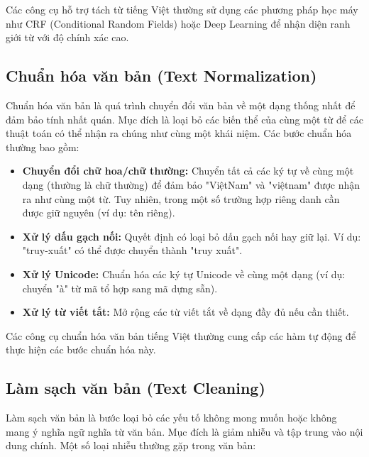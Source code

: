 \documentclass[../BTL.tex]{subfiles}
\begin{document}
Các công cụ hỗ trợ tách từ tiếng Việt thường sử dụng các phương pháp học máy như CRF (Conditional Random Fields) hoặc Deep Learning để nhận diện ranh giới từ với độ chính xác cao.

\subsection{Chuẩn hóa văn bản (Text Normalization)}
Chuẩn hóa văn bản là quá trình chuyển đổi văn bản về một dạng thống nhất để đảm bảo tính nhất quán. Mục đích là loại bỏ các biến thể của cùng một từ để các thuật toán có thể nhận ra chúng như cùng một khái niệm. Các bước chuẩn hóa thường bao gồm:

\begin{itemize}
    \item \textbf{Chuyển đổi chữ hoa/chữ thường:} Chuyển tất cả các ký tự về cùng một dạng (thường là chữ thường) để đảm bảo "ViệtNam" và "việtnam" được nhận ra như cùng một từ. Tuy nhiên, trong một số trường hợp riêng danh cần được giữ nguyên (ví dụ: tên riêng).
    
    \item \textbf{Xử lý dấu gạch nối:} Quyết định có loại bỏ dấu gạch nối hay giữ lại. Ví dụ: "truy-xuất" có thể được chuyển thành "truy xuất".
    
    \item \textbf{Xử lý Unicode:} Chuẩn hóa các ký tự Unicode về cùng một dạng (ví dụ: chuyển "à" từ mã tổ hợp sang mã dựng sẵn).
    
    \item \textbf{Xử lý từ viết tắt:} Mở rộng các từ viết tắt về dạng đầy đủ nếu cần thiết.
\end{itemize}

Các công cụ chuẩn hóa văn bản tiếng Việt thường cung cấp các hàm tự động để thực hiện các bước chuẩn hóa này.

\subsection{Làm sạch văn bản (Text Cleaning)}
Làm sạch văn bản là bước loại bỏ các yếu tố không mong muốn hoặc không mang ý nghĩa ngữ nghĩa từ văn bản. Mục đích là giảm nhiễu và tập trung vào nội dung chính. Một số loại nhiễu thường gặp trong văn bản:
\end{document}
